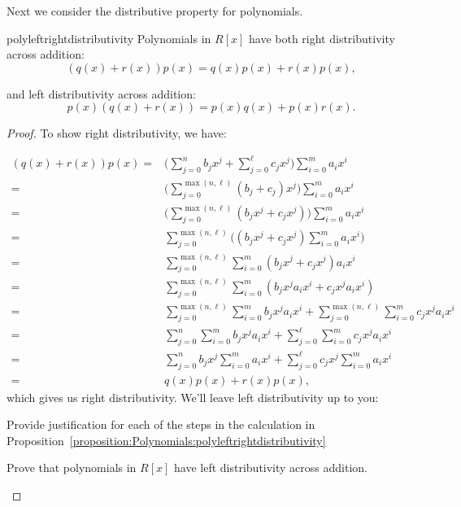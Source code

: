 Next we consider the distributive property for polynomials.

\begin{prop}{polyleftrightdistributivity} Polynomials in $R[x]$ have both right distributivity across addition:
\[(q(x)+r(x)) p(x) = q(x)p(x)+r(x)p(x),\]

and left distributivity across addition:
\[p(x)(q(x)+r(x)) = p(x)q(x)+p(x)r(x).\]

\end{prop}

\begin{proof}{}
To show right distributivity, we have:

\begin{align*}
(q(x)+r(x)) p(x)=&\bigg(\sum^{n}_{j=0} b_j x^j +  \sum^{\ell}_{j=0} c_jx^j\bigg)\sum^{m}_{i=0} a_i x^i\\
=&\bigg(\sum_{j=0}^{\max(n,\ell)} (b_j + c_j) x^j\bigg)\sum^{m}_{i=0} a_i x^i\\
=&\bigg(\sum_{j=0}^{\max(n,\ell)} (b_j x^j+ c_j x^j)\bigg)\sum^{m}_{i=0}a_ix^i\\
=&\sum_{j=0}^{\max(n,\ell)}\bigg((b_j x^j+ c_j x^j)\sum^{m}_{i=0}a_ix^i\bigg)\\
=&\sum_{j=0}^{\max(n,\ell)}\sum^{m}_{i=0} (b_j x^j+ c_j x^j)a_ix^i\\
=&\sum_{j=0}^{\max(n,\ell)}\sum^{m}_{i=0} (b_j x^ja_ix^i+ c_j x^ja_ix^i)\\
=&\sum_{j=0}^{\max(n,\ell)}\sum^{m}_{i=0} b_j x^ja_ix^i+ \sum_{j=0}^{\max(n,\ell)}\sum^{m}_{i=0}c_j x^ja_ix^i\\
=&\sum_{j=0}^{n}\sum^{m}_{i=0} b_j x^ja_ix^i+ \sum_{j=0}^{\ell}\sum^{m}_{i=0}c_j x^ja_ix^i\\
=&\sum^{n}_{j=0} b_j x^j\sum^{m}_{i=0} a_i x^i+ \sum^{\ell}_{j=0} c_jx^j \sum^{m}_{i=0} a_i x^i\\
=&q(x)p(x)+r(x)p(x),
\end{align*}
which gives us right distributivity. We'll leave left distributivity up to you:

\begin{exercise}{}
Provide justification for each of the steps in the calculation in Proposition~\ref{proposition:Polynomials:polyleftrightdistributivity}
\end{exercise}

\begin{exercise}{}
Prove that polynomials in $R[x]$ have left distributivity across addition.
\end{exercise}
\end{proof}
